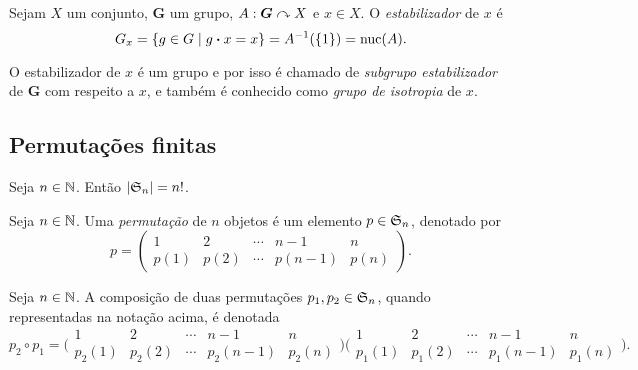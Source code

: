 \begin{definition}
Sejam $X$ um conjunto, $\bm G$ um grupo, $A: \bm G \curvearrowright X$ e $x \in X$. O \emph{estabilizador} de $x$ é
	\begin{equation*}
	G_x = \left\{{g \in G}\;\middle\vert\;{g\bm{\cdot} x = x}\right\} = A^{-1}(\{1\}) = \operatorname{nuc}(A).
	\end{equation*}
\end{definition}

O estabilizador de $x$ é um grupo e por isso é chamado de \emph{subgrupo estabilizador} de $\bm G$ com respeito a $x$, e também é conhecido como \emph{grupo de isotropia} de $x$.







\subsection{Permutações finitas}


\begin{exercise}
Seja $n \in \mathbb{N}$. Então $|\mathfrak{S}_n|=n!$.
\end{exercise}


\begin{definition}
Seja $n \in \mathbb{N}$. Uma \emph{permutação} de $n$ objetos é um elemento $p \in \mathfrak{S}_n$, denotado por
	\begin{equation*}
	p = \begin{pmatrix}
				1 & 2 & \cdots & n-1 & n \\
				p(1) & p(2) & \cdots &  p(n-1)  & p(n)
			\end{pmatrix}.
	\end{equation*}
\end{definition}

\begin{notation}
Seja $n \in \mathbb{N}$. A composição de duas permutações $p_1,p_2 \in \mathfrak{S}_n$, quando representadas na notação acima, é denotada
	\begin{equation*}
	p_2 \circ p_1 = \bigl(\begin{smallmatrix}
				1 & 2 & \cdots & n-1 & n \\
				p_2(1) & p_2(2) & \cdots &  p_2(n-1)  & p_2(n)
			\end{smallmatrix}\bigr)
			\bigl(\begin{smallmatrix}
				1 & 2 & \cdots & n-1 & n \\
				p_1(1) & p_1(2) & \cdots &  p_1(n-1)  & p_1(n)
			\end{smallmatrix}\bigr).
	\end{equation*}
\end{notation}

